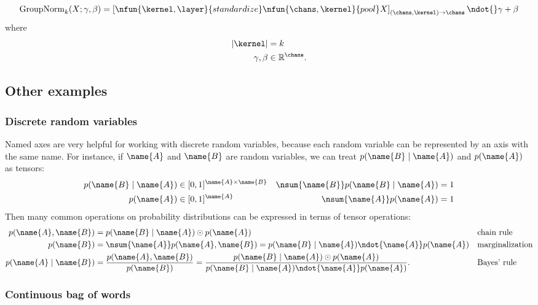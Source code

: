 \begin{align*}
\text{GroupNorm}_k(X; \gamma, \beta) &= \left[ \nfun{\kernel,\layer}{standardize} \nfun{\chans, \kernel}{pool} X \right]_{(\chans,\kernel)\rightarrow \chans } \ndot{} \gamma + \beta \\ 
\end{align*}
where
\begin{align*}
|\kernel| &= k\\
\gamma, \beta &\in \mathbb{R}^{\chans}.
\end{align*}
\fi

\iffalse
\subsection{Other examples}

\subsubsection{Discrete random variables}

Named axes are very helpful for working with discrete random variables, because each random variable can be represented by an axis with the same name. For instance, if $\name{A}$ and $\name{B}$ are random variables, we can treat $p(\name{B} \mid \name{A})$ and $p(\name{A})$ as tensors:
\begin{align*}
p(\name{B} \mid \name{A}) &\in [0, 1]^{\name{A} \times \name{B}} & \nsum{\name{B}} p(\name{B} \mid \name{A}) &= 1 \\
p(\name{A}) &\in [0, 1]^{\name{A}} & \nsum{\name{A}} p(\name{A}) &= 1
\end{align*}
Then many common operations on probability distributions can be expressed in terms of tensor operations:
\begin{align*}
p(\name{A}, \name{B}) &= p(\name{B} \mid \name{A}) \odot p(\name{A}) && \text{chain rule}\\
p(\name{B}) &= \nsum{\name{A}} p(\name{A}, \name{B}) = p(\name{B} \mid \name{A}) \ndot{\name{A}} p(\name{A}) && \text{marginalization} \\
p(\name{A} \mid \name{B}) &= \frac{p(\name{A}, \name{B})}{p(\name{B})} = \frac{p(\name{B} \mid \name{A}) \odot p(\name{A})}{p(\name{B} \mid \name{A}) \ndot{\name{A}} p(\name{A})}. && \text{Bayes' rule}
\end{align*}

\subsubsection{Continuous bag of words}

